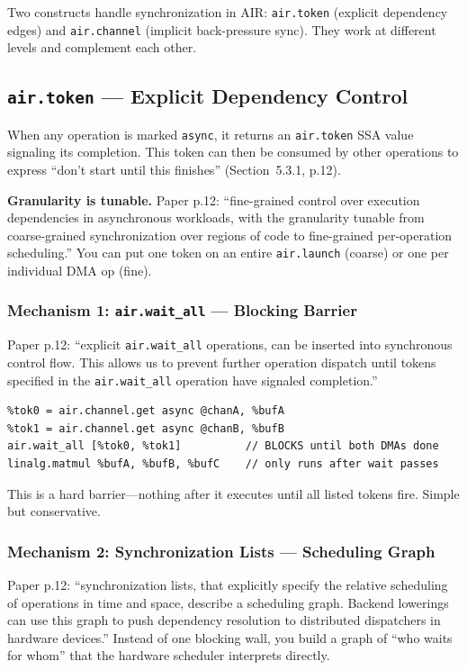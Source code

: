 \documentclass[11pt,a4paper]{article}
\begin{document}
Two constructs handle synchronization in AIR: \texttt{air.token} (explicit dependency
edges) and \texttt{air.channel} (implicit back-pressure sync). They work at different
levels and complement each other.

\subsection{\texttt{air.token} --- Explicit Dependency Control}

When any operation is marked \texttt{async}, it returns an \texttt{air.token} SSA
value signaling its completion. This token can then be consumed by other operations
to express ``don't start until this finishes'' (Section~5.3.1, p.12).

\textbf{Granularity is tunable.} Paper p.12: ``fine-grained control over execution
dependencies in asynchronous workloads, with the granularity tunable from
coarse-grained synchronization over regions of code to fine-grained per-operation
scheduling.'' You can put one token on an entire \texttt{air.launch} (coarse) or one
per individual DMA op (fine).

\subsubsection{Mechanism 1: \texttt{air.wait\_all} --- Blocking Barrier}

Paper p.12: ``explicit \texttt{air.wait\_all} operations, can be inserted into
synchronous control flow. This allows us to prevent further operation dispatch until
tokens specified in the \texttt{air.wait\_all} operation have signaled completion.''

\begin{lstlisting}
%tok0 = air.channel.get async @chanA, %bufA
%tok1 = air.channel.get async @chanB, %bufB
air.wait_all [%tok0, %tok1]          // BLOCKS until both DMAs done
linalg.matmul %bufA, %bufB, %bufC    // only runs after wait passes
\end{lstlisting}

This is a hard barrier---nothing after it executes until all listed tokens fire.
Simple but conservative.

\subsubsection{Mechanism 2: Synchronization Lists --- Scheduling Graph}

Paper p.12: ``synchronization lists, that explicitly specify the relative scheduling
of operations in time and space, describe a scheduling graph. Backend lowerings can
use this graph to push dependency resolution to distributed dispatchers in hardware
devices.'' Instead of one blocking wall, you build a graph of ``who waits for whom''
that the hardware scheduler interprets directly.
\end{document}
